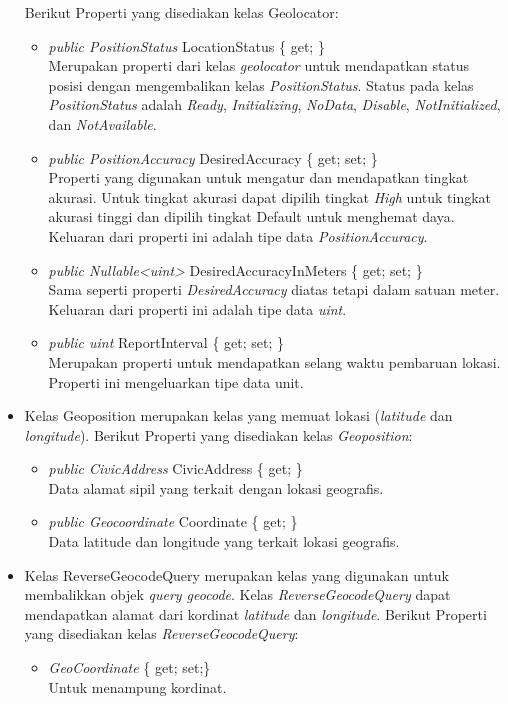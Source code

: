 \begin{itemize}
			Berikut Properti yang disediakan kelas Geolocator:
			\begin{itemize}
				\item \textit{public PositionStatus} LocationStatus \{ get; \} \\
					Merupakan properti dari kelas \textit{geolocator} untuk mendapatkan status posisi dengan mengembalikan kelas \textit{PositionStatus}. Status pada kelas \textit{PositionStatus} adalah \textit{Ready}, \textit{Initializing}, \textit{NoData}, \textit{Disable}, \textit{NotInitialized}, dan \textit{NotAvailable}.
				\item \textit{public PositionAccuracy} DesiredAccuracy \{ get; set; \} \\
					Properti yang digunakan untuk mengatur dan mendapatkan tingkat akurasi. Untuk tingkat akurasi dapat dipilih tingkat \textit{High} untuk tingkat akurasi tinggi dan dipilih tingkat {Default} untuk menghemat daya. Keluaran dari properti ini adalah tipe data \textit{PositionAccuracy}.
				\item \textit{public Nullable<uint>} DesiredAccuracyInMeters \{ get; set; \}\\
					Sama seperti properti \textit{DesiredAccuracy} diatas tetapi dalam satuan meter. Keluaran dari properti ini adalah tipe data \textit{uint}.
				\item \textit{public uint} ReportInterval \{ get; set; \} \\
					Merupakan properti untuk mendapatkan selang waktu pembaruan lokasi. Properti ini mengeluarkan tipe data unit.
			\end{itemize}
	\item Kelas Geoposition merupakan kelas yang memuat lokasi (\textit{latitude} dan \textit{longitude}). Berikut Properti yang disediakan kelas \textit{Geoposition}: \\
			\begin{itemize}
				\item \textit{public CivicAddress} CivicAddress \{ get; \} \\
					Data alamat sipil yang terkait dengan lokasi geografis.
				\item \textit{public Geocoordinate} Coordinate \{ get; \} \\
					Data latitude dan longitude yang terkait lokasi geografis.
			\end{itemize}
	\item Kelas ReverseGeocodeQuery merupakan kelas yang digunakan untuk membalikkan objek \textit{query geocode}. Kelas \textit{ReverseGeocodeQuery} dapat mendapatkan alamat dari kordinat \textit{latitude} dan \textit{longitude}.
			Berikut Properti yang disediakan kelas \textit{ReverseGeocodeQuery}:
			\begin{itemize}
				\item \textit{GeoCoordinate} \{ get; set;\} \\
				Untuk menampung kordinat.
			\end{itemize}


\end{itemize}
